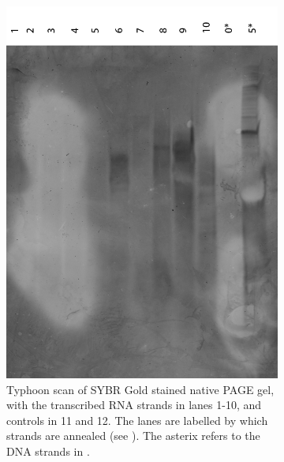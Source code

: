 \begin{figure}
  \begin{subfigure}{0.49\textwidth}
  \includegraphics[width=\textwidth]{images/translator_transcription_1.png}
  \caption{Typhoon scan of SYBR Gold stained native PAGE gel, with the transcribed RNA strands in lanes 1-10, and controls in 11 and 12. The lanes are labelled by which strands are annealed (see ). The asterix refers to the DNA strands in .}
  \label{transcription_1}
  \end{subfigure}
  \begin{subfigure}{0.49\textwidth}

\end{subfigure}
\end{figure}
